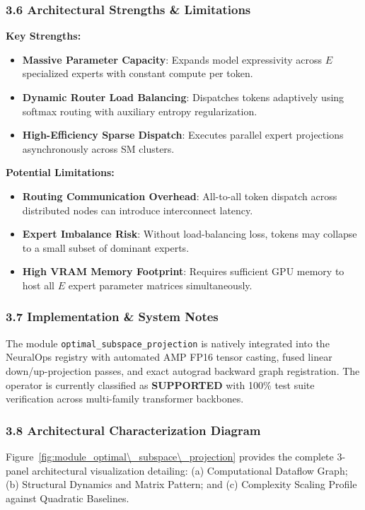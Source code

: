 \subsubsection*{3.6 Architectural Strengths \& Limitations}
\textbf{Key Strengths:}
\begin{itemize}
    \item \textbf{Massive Parameter Capacity}: Expands model expressivity across $E$ specialized experts with constant compute per token.
    \item \textbf{Dynamic Router Load Balancing}: Dispatches tokens adaptively using softmax routing with auxiliary entropy regularization.
    \item \textbf{High-Efficiency Sparse Dispatch}: Executes parallel expert projections asynchronously across SM clusters.
\end{itemize}

\textbf{Potential Limitations:}
\begin{itemize}
    \item \textbf{Routing Communication Overhead}: All-to-all token dispatch across distributed nodes can introduce interconnect latency.
    \item \textbf{Expert Imbalance Risk}: Without load-balancing loss, tokens may collapse to a small subset of dominant experts.
    \item \textbf{High VRAM Memory Footprint}: Requires sufficient GPU memory to host all $E$ expert parameter matrices simultaneously.
\end{itemize}

\subsubsection*{3.7 Implementation \& System Notes}
The module \texttt{optimal\_subspace\_projection} is natively integrated into the NeuralOps registry with automated AMP FP16 tensor casting, fused linear down/up-projection passes, and exact autograd backward graph registration. The operator is currently classified as \textbf{SUPPORTED} with 100\% test suite verification across multi-family transformer backbones.

\subsubsection*{3.8 Architectural Characterization Diagram}
Figure~\ref{fig:module_optimal\_subspace\_projection} provides the complete 3-panel architectural visualization detailing: (a) Computational Dataflow Graph; (b) Structural Dynamics and Matrix Pattern; and (c) Complexity Scaling Profile against Quadratic Baselines.

